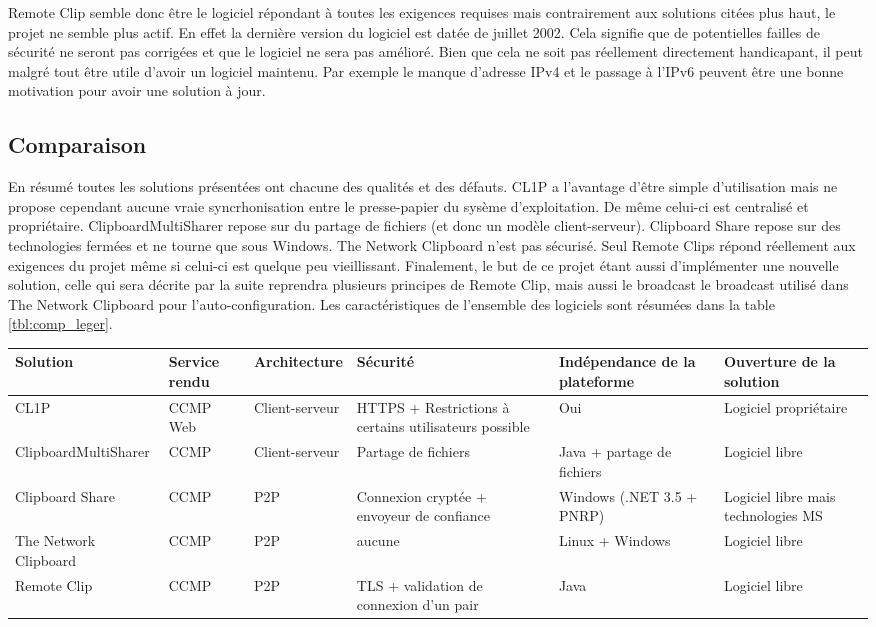 Remote Clip semble donc être le logiciel répondant à toutes les
exigences requises mais contrairement aux solutions citées plus haut,
le projet ne semble plus actif. En effet la dernière version du logiciel
est datée de juillet 2002. Cela signifie que de potentielles failles
de sécurité ne seront pas corrigées et que le logiciel ne sera pas amélioré.
Bien que cela ne soit pas réellement directement handicapant, il
peut malgré tout être utile d'avoir un logiciel maintenu. Par exemple
le manque d'adresse IPv4 et le passage à l'IPv6 peuvent être une bonne
motivation pour avoir une solution à jour.

\subsection{Comparaison}
En résumé toutes les solutions présentées ont chacune des qualités et des
défauts. CL1P a l'avantage d'être simple d'utilisation mais ne propose
cependant aucune vraie syncrhonisation entre le presse-papier du sysème
d'exploitation. De même celui-ci est centralisé et propriétaire.
ClipboardMultiSharer repose sur du partage de fichiers (et donc un
modèle client-serveur). Clipboard Share repose sur des technologies fermées
et ne tourne que sous Windows. The Network Clipboard n'est pas sécurisé.
Seul Remote Clips répond réellement aux exigences du projet même si celui-ci
est quelque peu vieillissant. Finalement, le but de ce projet étant aussi
d'implémenter une nouvelle solution, celle qui sera décrite par la suite
reprendra plusieurs principes de Remote Clip, mais aussi le broadcast le
broadcast utilisé dans The Network Clipboard pour l'auto-configuration.
Les caractéristiques de l'ensemble des logiciels sont résumées dans la
table \ref{tbl:comp_leger}.

\begin{sidewaystable}[!h]
  \centering
  \begin{tabular}{|l|l|l|m{7em}|m{7em}|m{7em}|}
    \hline
    Solution & Service rendu & Architecture & Sécurité & In\-dé\-pen\-dance
    de la plateforme & Ouverture de la solution \\
    \hline
    \hline
    CL1P & CCMP Web & Client-serveur & HTTPS + Restrictions à certains
    utilisateurs possible & Oui & Logiciel propriétaire \\
    \hline
    Clipboard\-MultiSharer & CCMP & Client-serveur & Partage de fichiers & Java
    + partage de fichiers & Logiciel libre\\
    \hline
    Clipboard Share & CCMP & P2P & Connexion cryptée + envoyeur de confiance &
    Windows (.NET 3.5 + PNRP) & Logiciel libre mais technologies MS \\
    \hline
    The Network Clipboard & CCMP & P2P & aucune & Linux + Windows &
    Logiciel libre \\
    \hline
    Remote Clip & CCMP & P2P & TLS + validation de connexion d'un pair &
    Java & Logiciel libre \\
    \hline
  \end{tabular}
  \caption{\label{tbl:comp_leger} Comparaison des solutions légères}
\end{sidewaystable}
\clearpage
